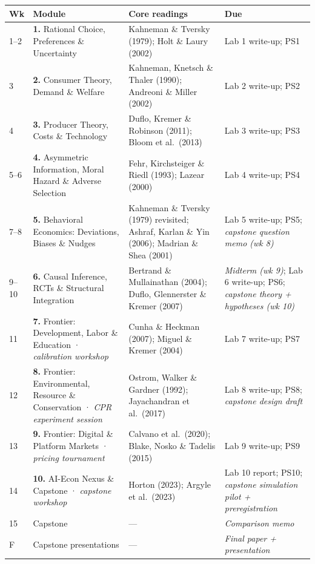 \documentclass[11pt]{article}
\begin{document}
\begin{longtable}{@{}p{0.7cm}p{4.3cm}p{5.6cm}p{3.6cm}@{}}
\toprule
Wk & Module & Core readings & Due \\
\midrule
\endhead
1--2 & \textbf{1.} Rational Choice, Preferences \& Uncertainty &
Kahneman \& Tversky (1979); Holt \& Laury (2002) &
Lab 1 write-up; PS1 \\
3 & \textbf{2.} Consumer Theory, Demand \& Welfare &
Kahneman, Knetsch \& Thaler (1990); Andreoni \& Miller (2002) &
Lab 2 write-up; PS2 \\
4 & \textbf{3.} Producer Theory, Costs \& Technology &
Duflo, Kremer \& Robinson (2011); Bloom et al.\ (2013) &
Lab 3 write-up; PS3 \\
5--6 & \textbf{4.} Asymmetric Information, Moral Hazard \& Adverse
Selection & Fehr, Kirchsteiger \& Riedl (1993); Lazear (2000) &
Lab 4 write-up; PS4 \\
7--8 & \textbf{5.} Behavioral Economics: Deviations, Biases \& Nudges &
Kahneman \& Tversky (1979) revisited; Ashraf, Karlan \& Yin (2006);
Madrian \& Shea (2001) &
Lab 5 write-up; PS5; \emph{capstone question memo (wk 8)} \\
9--10 & \textbf{6.} Causal Inference, RCTs \& Structural Integration &
Bertrand \& Mullainathan (2004); Duflo, Glennerster \& Kremer (2007) &
\emph{Midterm (wk 9)}; Lab 6 write-up; PS6; \emph{capstone theory +
hypotheses (wk 10)} \\
11 & \textbf{7.} Frontier: Development, Labor \& Education ·
\emph{calibration workshop} & Cunha \& Heckman (2007); Miguel \&
Kremer (2004) & Lab 7 write-up; PS7 \\
12 & \textbf{8.} Frontier: Environmental, Resource \& Conservation ·
\emph{CPR experiment session} & Ostrom, Walker \& Gardner (1992);
Jayachandran et al.\ (2017) & Lab 8 write-up; PS8; \emph{capstone
design draft} \\
13 & \textbf{9.} Frontier: Digital \& Platform Markets ·
\emph{pricing tournament} & Calvano et al.\ (2020); Blake, Nosko \&
Tadelis (2015) & Lab 9 write-up; PS9 \\
14 & \textbf{10.} AI-Econ Nexus \& Capstone ·
\emph{capstone workshop} & Horton (2023); Argyle et al.\ (2023) &
Lab 10 report; PS10; \emph{capstone simulation pilot +
preregistration} \\
15 & Capstone & --- & \emph{Comparison memo} \\
F & Capstone presentations & --- & \emph{Final paper +
presentation} \\
\bottomrule
\end{longtable}
\end{document}
